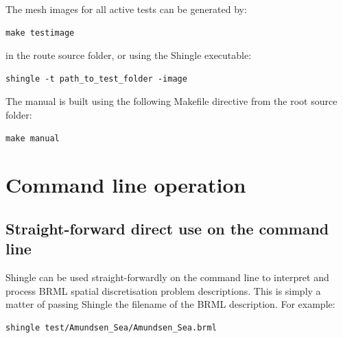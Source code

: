\documentclass[a4paper, 10pt]{book}
\providecommand{\shingle}{Shingle\xspace}
\providecommand{\brml}{BRML\xspace}
\begin{document}
\noindent
The mesh images for all active tests can be generated by:
\begin{verbatim}
make testimage
\end{verbatim}

\noindent
in the route source folder, or using the \shingle executable:
\begin{verbatim}
shingle -t path_to_test_folder -image
\end{verbatim}

\noindent
The manual is built using the following Makefile directive from the root source folder:
\begin{verbatim}
make manual
\end{verbatim}

\chapter{Command line operation}

\section{Straight-forward direct use on the command line}
\shingle can be used straight-forwardly on the command line to interpret and process \brml spatial discretisation problem descriptions.
This is simply a matter of passing \shingle the filename of the \brml description.
For example:
\begin{verbatim}
shingle test/Amundsen_Sea/Amundsen_Sea.brml
\end{verbatim}
\end{document}

